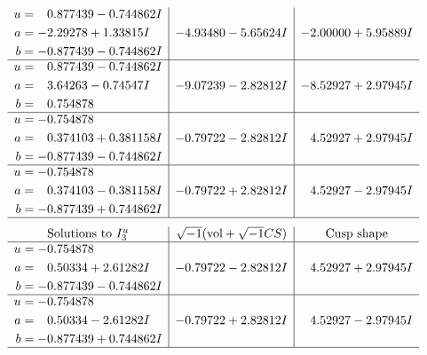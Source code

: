\documentclass[1p]{elsarticle_modified}
\theoremstyle{definition}
\newcommand{\I}{\sqrt{-1}}
\begin{document}
$$\begin{array}{c|c|c}
\begin{aligned}
u &= \phantom{-}0.877439 - 0.744862 I \\
a &= -2.29278 + 1.33815 I \\
b &= -0.877439 - 0.744862 I\end{aligned}
 & -4.93480 - 5.65624 I & -2.00000 + 5.95889 I \\ \hline\begin{aligned}
u &= \phantom{-}0.877439 - 0.744862 I \\
a &= \phantom{-}3.64263 - 0.74547 I \\
b &= \phantom{-}0.754878\phantom{ +0.000000I}\end{aligned}
 & -9.07239 - 2.82812 I & -8.52927 + 2.97945 I \\ \hline\begin{aligned}
u &= -0.754878\phantom{ +0.000000I} \\
a &= \phantom{-}0.374103 + 0.381158 I \\
b &= -0.877439 - 0.744862 I\end{aligned}
 & -0.79722 - 2.82812 I & \phantom{-}4.52927 + 2.97945 I \\ \hline\begin{aligned}
u &= -0.754878\phantom{ +0.000000I} \\
a &= \phantom{-}0.374103 - 0.381158 I \\
b &= -0.877439 + 0.744862 I\end{aligned}
 & -0.79722 + 2.82812 I & \phantom{-}4.52927 - 2.97945 I\\
 \hline 
 \end{array}$$\newpage$$\begin{array}{c|c|c}  
\text{Solutions to }I^u_{3}& \I (\text{vol} + \sqrt{-1}CS) & \text{Cusp shape}\\
 \hline 
\begin{aligned}
u &= -0.754878\phantom{ +0.000000I} \\
a &= \phantom{-}0.50334 + 2.61282 I \\
b &= -0.877439 - 0.744862 I\end{aligned}
 & -0.79722 - 2.82812 I & \phantom{-}4.52927 + 2.97945 I \\ \hline\begin{aligned}
u &= -0.754878\phantom{ +0.000000I} \\
a &= \phantom{-}0.50334 - 2.61282 I \\
b &= -0.877439 + 0.744862 I\end{aligned}
 & -0.79722 + 2.82812 I & \phantom{-}4.52927 - 2.97945 I\\
 \hline 
 \end{array}$$\newpage\newpage\renewcommand{\arraystretch}{1}
\end{document}
